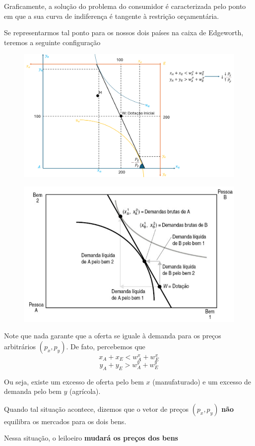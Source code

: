 \documentclass[a4paper,12pt]{article}[abntex2]
\begin{document}
Graficamente, a solução do problema do consumidor é caracterizada pelo ponto em que a sua curva de indiferença é tangente à restrição orçamentária.

Se representarmos tal ponto para os nossos dois países na caixa de Edgeworth, teremos a seguinte configuração

\begin{figure}[H]
    \centering
    \includegraphics[width=0.70\linewidth]{Imagens/a3i9.png}
\end{figure}

\begin{figure}[H]
    \centering
    \includegraphics[width=0.70\linewidth]{Imagens/a2i6.png}
\end{figure}



Note que nada garante que a oferta se iguale à demanda para os preços arbitrários $(p_x, p_y)$. De fato, percebemos que
\[
x_A + x_E < w_A^x + w_E^x
\]
\[
y_A + y_E > w_A^y + w_E^y
\]

Ou seja, existe um excesso de oferta pelo bem $x$ (manufaturado) e um excesso de demanda pelo bem $y$ (agrícola).

Quando tal situação acontece, dizemos que o vetor de preços $(p_x, p_y)$ \textbf{não} equilibra os mercados para os dois bens.

Nessa situação, o leiloeiro \textbf{mudará os preços dos bens}
\end{document}
